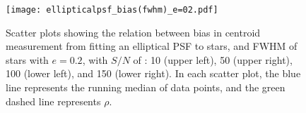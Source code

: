 \documentclass[12pt, preprint]{aastex}
\begin{document}
\begin{figure}[!htb]
  \texttt{[image: ellipticalpsf\_bias(fwhm)\_e=02.pdf]}
\endminipage
\caption{Scatter plots showing the relation between bias in centroid measurement from fitting an elliptical PSF to stars, and FWHM of stars with $e=0.2$, with $S/N$  of : 10 (upper left), 50 (upper right), 100 (lower left), and 150 (lower right). In each scatter plot, the blue line represents the running median of data points, and the green dashed line represents $\rho$.}\label{30}
\end{figure}
\end{document}

